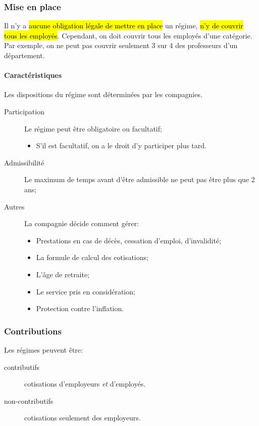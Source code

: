 \documentclass[10pt, french]{article}
\begin{document}
\begin{multicols*}{3}
\subsubsection*{Mise en place}
Il n'y a \hl{aucune obligation légale de mettre en place} un régime, \hl{n'y de couvrir tous les employés}. Cependant, on doit couvrir tous les employés d'une catégorie. Par exemple, on ne peut pas couvrir seulement 3 sur 4 des professeurs d'un département.

\paragraph*{Caractéristiques}	Les dispositions du régime sont déterminées par les compagnies.
\begin{description}
	\item[Participation]	Le régime peut être obligatoire ou facultatif;
		\begin{itemize}[leftmargin = *]
		\item	S'il est facultatif, on a le droit d'y participer plus tard.
		\end{itemize}
	\item[Admissibilité]	Le maximum de temps avant d'être admissible ne peut pas être plus que 2 ans;
	\item[Autres]	La compagnie décide comment gérer:
		\begin{itemize}[leftmargin = *]
		\item	Prestations en cas de décès, cessation d'emploi, d'invalidité;
		\item	La formule de calcul des cotisations;
		\item	L'âge de retraite;
		\item	Le service pris en considération;
		\item	Protection contre l'inflation.
		\end{itemize}
\end{description}


\subsubsection*{Contributions}
Les régimes peuvent être:
\begin{description}
	\item[contributifs]	cotisations d'employeurs \textit{et} d'employés.
	\item[non-contributifs]	cotisations seulement des employeurs.
\end{description}


\end{multicols*}
\end{document}
